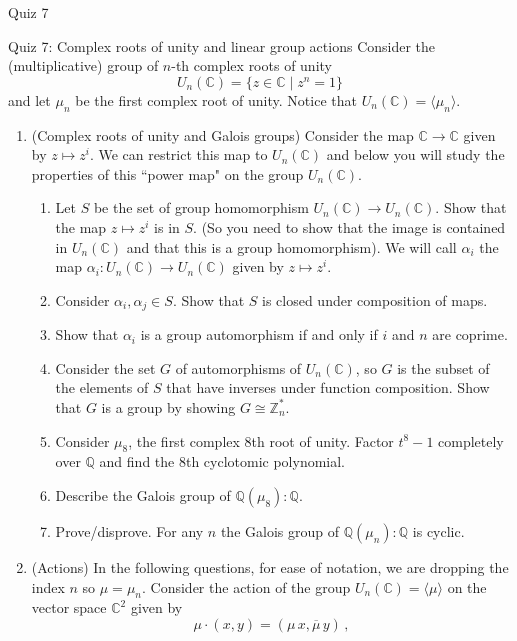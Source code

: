 \documentclass[12pt]{article}
\begin{document}
\begin{quiz}{Quiz 7}
\begin{essay}[response field lines=5,attachments allowed=0]{Quiz 7: Complex roots of unity and linear group actions} 
Consider the (multiplicative) group of $n$-th complex roots of unity
\[U_n(\mathbb{C})=\{z \in \mathbb{C} \mid z^n=1\}\]
and let $\mu_n$ be the first complex root of unity. Notice that $U_n(\mathbb{C})=\langle \mu_n\rangle$.
\begin{enumerate}
\item (Complex roots of unity and Galois groups) Consider the map $\mathbb{C} \to \mathbb{C}$ given by $z \mapsto z^i$. We can restrict this map to $U_n(\mathbb{C})$ and below you will study the properties of this ``power map" on the group $U_n(\mathbb{C})$.
\begin{enumerate}
\item Let $S$ be the set of group homomorphism $U_n(\mathbb{C}) \to U_n(\mathbb{C})$. Show that the map $z \mapsto z^i$ is in $S$. (So you need to show that the image is contained in $U_n(\mathbb{C})$ and that this is a group homomorphism). We will call $\alpha_i$ the map $\alpha_i: U_n(\mathbb{C}) \to U_n(\mathbb{C})$ given by $z \mapsto z^i$.  
    \item  Consider $\alpha_i, \alpha_j \in S$. Show that $S$ is closed under composition of maps.
    \item Show that $\alpha_i$ is a group automorphism if and only if $i$ and $n$ are coprime.
    \item Consider the set $G$ of automorphisms of $U_n(\mathbb{C})$, so $G$ is the subset of the elements of $S$ that have inverses under function composition. Show that $G$ is a group by showing $G \cong \mathbb{Z}_n^*$.
    \item Consider $\mu_8$, the first complex 8th root of unity. Factor $t^8-1$ completely over $\mathbb{Q}$ and find the 8th cyclotomic polynomial.
    \item Describe the Galois group of $\mathbb{Q}(\mu_8):\mathbb{Q}$.
    \item Prove/disprove. For any $n$ the Galois group of $\mathbb{Q}(\mu_n):\mathbb{Q}$ is cyclic.
    \end{enumerate}    
\item (Actions)  In the following questions, for ease of notation, we are dropping the index $n$ so $\mu=\mu_n$. Consider the action of the group $U_n(\mathbb{C})=\langle \mu \rangle$ on the vector space $\mathbb{C}^2$ given by 
\[\mu \cdotp (x , y) = (\mu\,   x , \overline{\mu} \,   y) \, ,\] 

\end{enumerate}
\end{essay}
\end{quiz}
\end{document}
